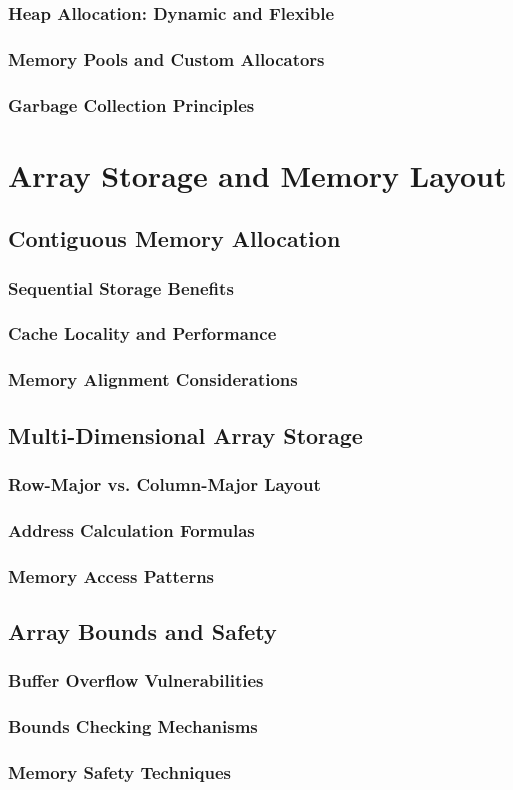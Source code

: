 \documentclass[12pt, oneside, openany]{book}
\begin{document}
\subsubsection{Heap Allocation: Dynamic and Flexible}
\subsubsection{Memory Pools and Custom Allocators}
\subsubsection{Garbage Collection Principles}

\section{Array Storage and Memory Layout}
\subsection{Contiguous Memory Allocation}
\subsubsection{Sequential Storage Benefits}
\subsubsection{Cache Locality and Performance}
\subsubsection{Memory Alignment Considerations}

\subsection{Multi-Dimensional Array Storage}
\subsubsection{Row-Major vs. Column-Major Layout}
\subsubsection{Address Calculation Formulas}
\subsubsection{Memory Access Patterns}

\subsection{Array Bounds and Safety}
\subsubsection{Buffer Overflow Vulnerabilities}
\subsubsection{Bounds Checking Mechanisms}
\subsubsection{Memory Safety Techniques}
	
\end{document}
